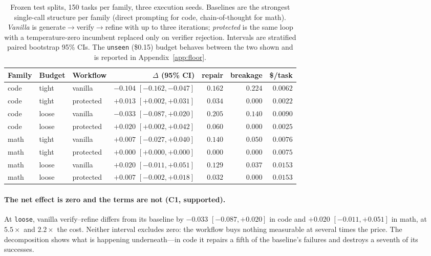 \documentclass{article}
\begin{document}
\begin{table}[t]
\caption{Frozen test splits, 150 tasks per family, three execution seeds.
Baselines are the strongest single-call structure per family (direct prompting
for code, chain-of-thought for math). \emph{Vanilla} is
generate$\to$verify$\to$refine with up to three iterations; \emph{protected} is
the same loop with a temperature-zero incumbent replaced only on verifier
rejection. Intervals are stratified paired bootstrap 95\% CIs. The
\texttt{unseen} (\$0.15) budget behaves between the two shown and is reported in
Appendix~\ref{app:floor}.}
\label{tab:parti}
\centering
\small
\begin{tabular}{lllrrrr}
\toprule
Family & Budget & Workflow & $\Delta$ (95\% CI) & repair & breakage & \$/task \\
\midrule
code & tight  & vanilla   & $-0.104$ $[-0.162,-0.047]$ & $0.162$ & $0.224$ & $0.0062$ \\
code & tight  & protected & $+0.013$ $[+0.002,+0.031]$ & $0.034$ & $\mathbf{0.000}$ & $0.0022$ \\
code & loose  & vanilla   & $-0.033$ $[-0.087,+0.020]$ & $0.205$ & $0.140$ & $0.0090$ \\
code & loose  & protected & $+0.020$ $[+0.002,+0.042]$ & $0.060$ & $\mathbf{0.000}$ & $0.0025$ \\
\midrule
math & tight  & vanilla   & $+0.007$ $[-0.027,+0.040]$ & $0.140$ & $0.050$ & $0.0076$ \\
math & tight  & protected & $+0.000$ $[+0.000,+0.000]$ & $0.000$ & $\mathbf{0.000}$ & $0.0075$ \\
math & loose  & vanilla   & $+0.020$ $[-0.011,+0.051]$ & $0.129$ & $0.037$ & $0.0153$ \\
math & loose  & protected & $+0.007$ $[-0.002,+0.018]$ & $0.032$ & $\mathbf{0.000}$ & $0.0153$ \\
\bottomrule
\end{tabular}
\end{table}

\paragraph{The net effect is zero and the terms are not (C1, supported).} At
\texttt{loose}, vanilla verify--refine differs from its baseline by $-0.033$
$[-0.087,+0.020]$ in code and $+0.020$ $[-0.011,+0.051]$ in math, at $5.5\times$
and $2.2\times$ the cost. Neither interval excludes zero: the workflow buys
nothing measurable at several times the price. The decomposition shows what is
happening underneath---in code it repairs a fifth of the baseline's failures and
destroys a seventh of its successes.
\end{document}
